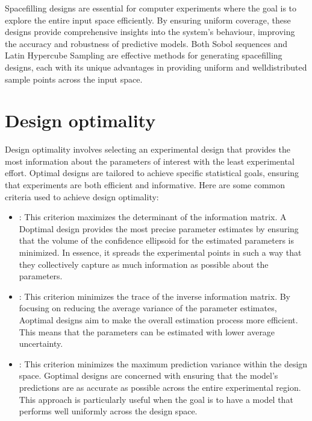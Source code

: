 \documentclass[letterpaper,10pt,english]{jupyterBook}
\begin{document}
\sphinxAtStartPar
Space\sphinxhyphen{}filling designs are essential for computer experiments where the goal is to explore the entire input space efficiently. By ensuring uniform coverage, these designs provide comprehensive insights into the system’s behaviour, improving the accuracy and robustness of predictive models. Both Sobol sequences and Latin Hypercube Sampling are effective methods for generating space\sphinxhyphen{}filling designs, each with its unique advantages in providing uniform and well\sphinxhyphen{}distributed sample points across the input space.


\section{Design optimality}
\label{\detokenize{notebooks/design_of_experiments:design-optimality}}
\sphinxAtStartPar
Design optimality involves selecting an experimental design that provides the most information about the parameters of interest with the least experimental effort. Optimal designs are tailored to achieve specific statistical goals, ensuring that experiments are both efficient and informative. Here are some common criteria used to achieve design optimality:
\begin{itemize}
\item {} 
\sphinxAtStartPar
{}: This criterion maximizes the determinant of the information matrix. A D\sphinxhyphen{}optimal design provides the most precise parameter estimates by ensuring that the volume of the confidence ellipsoid for the estimated parameters is minimized. In essence, it spreads the experimental points in such a way that they collectively capture as much information as possible about the parameters.

\item {} 
\sphinxAtStartPar
{}: This criterion minimizes the trace of the inverse information matrix. By focusing on reducing the average variance of the parameter estimates, A\sphinxhyphen{}optimal designs aim to make the overall estimation process more efficient. This means that the parameters can be estimated with lower average uncertainty.

\item {} 
\sphinxAtStartPar
{}: This criterion minimizes the maximum prediction variance within the design space. G\sphinxhyphen{}optimal designs are concerned with ensuring that the model’s predictions are as accurate as possible across the entire experimental region. This approach is particularly useful when the goal is to have a model that performs well uniformly across the design space.

\end{itemize}
\end{document}

